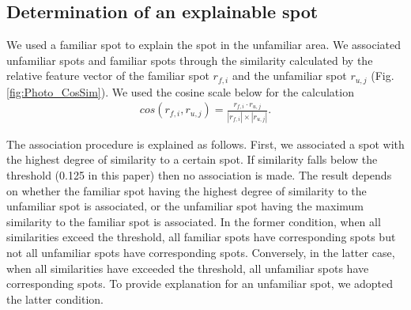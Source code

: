 \documentclass[journal]{IAENGtran}
\begin{document}
\subsection{Determination of an explainable spot}
\label{subsec:Determination of an explainable spot}
We used a familiar spot to explain the spot in the unfamiliar area.
We associated unfamiliar spots and familiar spots through the similarity calculated by the relative feature vector of the familiar spot $r_{f,i}$ and the unfamiliar spot $r_{u,j}$ (Fig. \ref{fig:Photo_CosSim}).
We used the cosine scale below for the calculation
\begin{eqnarray}
  cos(r_{f,i},r_{u,j})=\frac{r_{f,i} \cdot r_{u,j}}{|r_{f,i}| \times |r_{u,j}|}.
  \label{math:CosSim}
\end{eqnarray}

The association procedure is explained as follows.
First, we associated a spot with the highest degree of similarity to a certain spot.
If similarity falls below the threshold (0.125 in this paper) then no association is made.
The result depends on whether the familiar spot having the highest degree of similarity to the unfamiliar spot is associated, or the unfamiliar spot having the maximum similarity to the familiar spot is associated.
In the former condition, when all similarities exceed the threshold, all familiar spots have corresponding spots but not all unfamiliar spots have corresponding spots.
Conversely, in the latter case, when all similarities have exceeded the threshold, all unfamiliar spots have corresponding spots.
To provide explanation for an unfamiliar spot, we adopted the latter condition.
\end{document}
